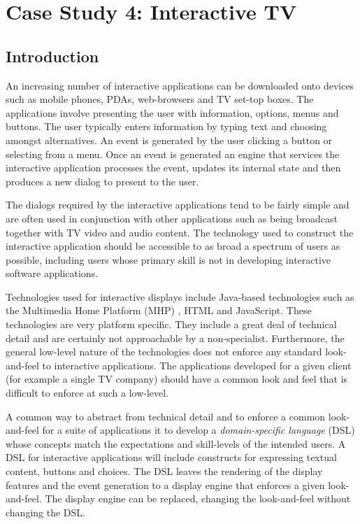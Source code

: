 \chapter{Case Study 4: Interactive TV}

\section{Introduction}

An increasing number of interactive applications can be downloaded
onto devices such as mobile phones, PDAs, web-browsers and TV set-top
boxes. The applications involve presenting the user with information,
options, menus and buttons. The user typically enters information
by typing text and choosing amongst alternatives. An event is generated
by the user clicking a button or selecting from a menu. Once an event
is generated an engine that services the interactive application processes
the event, updates its internal state and then produces a new dialog
to present to the user.

The dialogs required by the interactive applications tend to be fairly
simple and are often used in conjunction with other applications such
as being broadcast together with TV video and audio content. The technology
used to construct the interactive application should be accessible
to as broad a spectrum of users as possible, including users whose
primary skill is not in developing interactive software applications.

Technologies used for interactive displays include Java-based technologies
such as the Multimedia Home Platform (MHP)\cite{MHP} , HTML and JavaScript.
These technologies are very platform specific. They include a great
deal of technical detail and are certainly not approachable by a non-specialist.
Furthermore, the general low-level nature of the technologies does
not enforce any standard look-and-feel to interactive applications.
The applications developed for a given client (for example a single
TV company) should have a common look and feel that is difficult to
enforce at such a low-level.

A common way to abstract from technical detail and to enforce a common
look-and-feel for a suite of applications it to develop a \emph{domain-specific
language} (DSL) whose concepts match the expectations and skill-levels
of the intended users. A DSL for interactive applications will include
constructs for expressing textual content, buttons and choices. The
DSL leaves the rendering of the display features and the event generation
to a display engine that enforces a given look-and-feel. The display
engine can be replaced, changing the look-and-feel without changing
the DSL.

